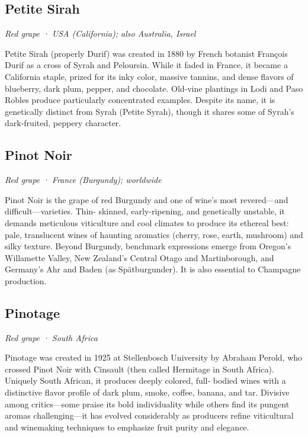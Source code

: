 \subsection*{Petite Sirah}
\textit{Red grape · USA (California); also Australia, Israel}\par\smallskip

Petite Sirah (properly Durif) was created in 1880 by French botanist François Durif as a cross of Syrah and Peloursin. While it faded in France, it became a California staple, prized for its inky color, massive tannins, and dense flavors of blueberry, dark plum, pepper, and chocolate. Old-vine plantings in Lodi and Paso Robles produce particularly concentrated examples. Despite its name, it is genetically distinct from Syrah (Petite Syrah), though it shares some of Syrah’s dark-fruited, peppery character.

\subsection*{Pinot Noir}
\textit{Red grape · France (Burgundy); worldwide}\par\smallskip

Pinot Noir is the grape of red Burgundy and one of wine’s most revered—and difficult—varieties. Thin- skinned, early-ripening, and genetically unstable, it demands meticulous viticulture and cool climates to produce its ethereal best: pale, translucent wines of haunting aromatics (cherry, rose, earth, mushroom) and silky texture. Beyond Burgundy, benchmark expressions emerge from Oregon’s Willamette Valley, New Zealand’s Central Otago and Martinborough, and Germany’s Ahr and Baden (as Spätburgunder). It is also essential to Champagne production.

\subsection*{Pinotage}
\textit{Red grape · South Africa}\par\smallskip

Pinotage was created in 1925 at Stellenbosch University by Abraham Perold, who crossed Pinot Noir with Cinsault (then called Hermitage in South Africa). Uniquely South African, it produces deeply colored, full- bodied wines with a distinctive flavor profile of dark plum, smoke, coffee, banana, and tar. Divisive among critics—some praise its bold individuality while others find its pungent aromas challenging—it has evolved considerably as producers refine viticultural and winemaking techniques to emphasize fruit purity and elegance.

